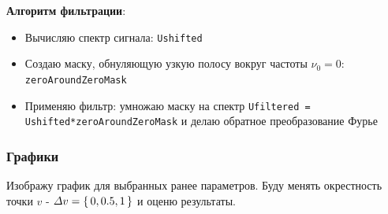\documentclass[a4paper,12pt]{article}
\begin{document}
\textbf{Алгоритм фильтрации}:
\begin{itemize}
	\item Вычисляю спектр сигнала: \texttt{Ushifted}
	\item Создаю маску, обнуляющую узкую полосу вокруг частоты \(\nu_0 = 0\):       \texttt{ zeroAroundZeroMask}
	\item Применяю фильтр: умножаю маску на спектр \texttt{Ufiltered = Ushifted*zeroAroundZeroMask} и делаю обратное преобразование Фурье
	
\end{itemize}

\subsubsection{Графики}

Изображу график для выбранных ранее параметров. Буду менять окрестность точки \(v\) - \(\varDelta v = \set{0, 0.5, 1}\) и оценю результаты.
\end{document}
